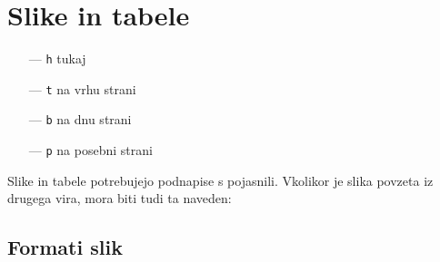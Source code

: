 \chapter{Slike in tabele}
\label{ch3}


\begin{itemize}
\item[---]{{\tt h} \hspace{1 cm} tukaj}
\item[---]{{\tt t} \hspace{1 cm} na vrhu strani}
\item[---]{{\tt b} \hspace{1 cm} na dnu strani}
\item[---]{{\tt p} \hspace{1 cm} na posebni strani}
\end{itemize}

\noindent
Slike in tabele potrebujejo podnapise s pojasnili. Vkolikor je slika povzeta iz drugega vira, mora biti tudi ta naveden:





\newpage
\section{Formati slik}





